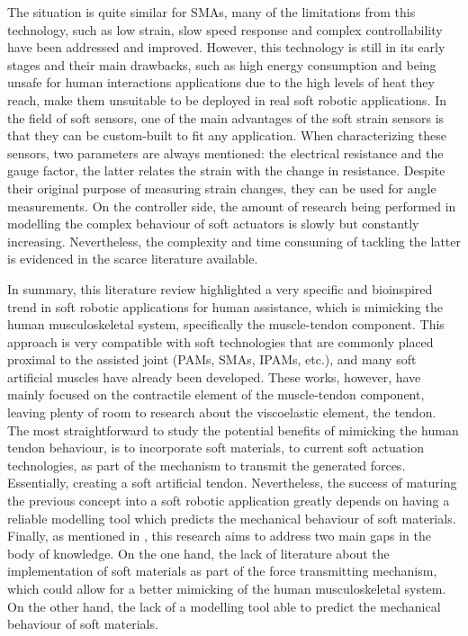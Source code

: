 The situation is quite similar for SMAs, many of the limitations from this technology, such as low strain, slow speed response and complex controllability have been addressed and improved. However, this technology is still in its early stages and their main drawbacks, such as high energy consumption and being unsafe for human interactions applications due to the high levels of heat they reach, make them unsuitable to be deployed in real soft robotic applications. In the field of soft sensors, one of the main advantages of the soft strain sensors is that they can be custom-built to fit any application. When characterizing these sensors, two parameters are always mentioned: the electrical resistance and the gauge factor, the latter relates the strain with the change in resistance. Despite their original purpose of measuring strain changes, they can be used for angle measurements. On the controller side, the amount of research being performed in modelling the complex behaviour of soft actuators is slowly but constantly increasing. Nevertheless, the complexity and time consuming of tackling the latter is evidenced in the scarce literature available.

In summary, this literature review highlighted a very specific and bioinspired trend in soft robotic applications for human assistance, which is mimicking the human musculoskeletal system, specifically the muscle-tendon component. This approach is very compatible with soft technologies that are commonly placed proximal to the assisted joint (PAMs, SMAs, IPAMs, etc.), and many soft artificial muscles have already been developed. These works, however, have mainly focused on the contractile element of the muscle-tendon component, leaving plenty of room to research about the viscoelastic element, the tendon. The most straightforward to study the potential benefits of mimicking the human tendon behaviour, is to incorporate soft materials, to current soft actuation technologies, as part of the mechanism to transmit the generated forces. Essentially, creating a soft artificial tendon. Nevertheless, the success of maturing the previous concept into a soft robotic application greatly depends on having a reliable modelling tool which predicts the mechanical behaviour of soft materials. Finally, as mentioned in , this research aims to address two main gaps in the body of knowledge. On the one hand, the lack of literature about the implementation of soft materials as part of the force transmitting mechanism, which could allow for a better mimicking of the human musculoskeletal system. On the other hand, the lack of a modelling tool able to predict the mechanical behaviour of soft materials.
